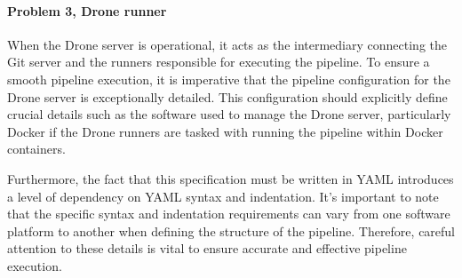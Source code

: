 \paragraph{Problem 3, Drone runner}
When the Drone server is operational, it acts as the intermediary connecting the Git server 
and the runners responsible for executing the pipeline. 
To ensure a smooth pipeline execution, it is imperative that the pipeline configuration 
for the Drone server is exceptionally detailed. This configuration should explicitly define 
crucial details such as the software used to manage the Drone server, particularly Docker if the Drone runners 
are tasked with running the pipeline within Docker containers.

Furthermore, the fact that this specification must be written in YAML introduces a 
level of dependency on YAML syntax and indentation. It's important to note that the 
specific syntax and indentation requirements can vary from one software platform to another when defining the structure of the pipeline. 
Therefore, careful attention to these details is vital to ensure accurate and effective pipeline execution.